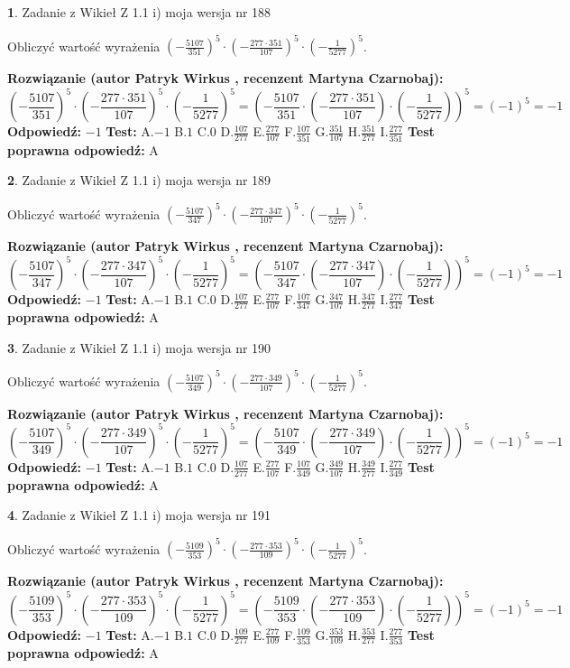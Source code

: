 \documentclass[12pt, a4paper]{article}
\theoremstyle{definition} %
\newtheorem{zad}{}
\newcommand{\zadStart}[1]{\begin{zad}#1\newline}
\newcommand{\zadStop}{\end{zad}}
\newcommand{\rozwStart}[2]{\noindent \textbf{Rozwiązanie (autor #1 , recenzent #2): }\newline}
\newcommand{\rozwStop}{\newline}
\newcommand{\odpStart}{\noindent \textbf{Odpowiedź:}\newline}
\newcommand{\odpStop}{\newline}
\newcommand{\testStart}{\noindent \textbf{Test:}\newline}
\newcommand{\testStop}{\newline}
\newcommand{\kluczStart}{\noindent \textbf{Test poprawna odpowiedź:}\newline}
\newcommand{\kluczStop}{\newline}
\begin{document}
\zadStart{Zadanie z Wikieł Z 1.1 i) moja wersja nr 188}

Obliczyć wartość wyrażenia $(-\frac{5107}{351})^{5} \cdot (-\frac{277 \cdot 351}{107})^{5} \cdot (-\frac{1}{5277})^{5}$.
\zadStop
\rozwStart{Patryk Wirkus}{Martyna Czarnobaj}
$$(-\frac{5107}{351})^{5} \cdot (-\frac{277 \cdot 351}{107})^{5} \cdot (-\frac{1}{5277})^{5} = (-\frac{5107}{351} \cdot (-\frac{277 \cdot 351}{107}) \cdot (-\frac{1}{5277}))^{5} = (-1)^{5} = -1$$
\rozwStop
\odpStart
$-1$
\odpStop
\testStart
A.$-1$ B.$1$ C.$0$ D.$\frac{107}{277}$ E.$\frac{277}{107}$
F.$\frac{107}{351}$ G.$\frac{351}{107}$
H.$\frac{351}{277}$
I.$\frac{277}{351}$
\testStop
\kluczStart
A
\kluczStop



\zadStart{Zadanie z Wikieł Z 1.1 i) moja wersja nr 189}

Obliczyć wartość wyrażenia $(-\frac{5107}{347})^{5} \cdot (-\frac{277 \cdot 347}{107})^{5} \cdot (-\frac{1}{5277})^{5}$.
\zadStop
\rozwStart{Patryk Wirkus}{Martyna Czarnobaj}
$$(-\frac{5107}{347})^{5} \cdot (-\frac{277 \cdot 347}{107})^{5} \cdot (-\frac{1}{5277})^{5} = (-\frac{5107}{347} \cdot (-\frac{277 \cdot 347}{107}) \cdot (-\frac{1}{5277}))^{5} = (-1)^{5} = -1$$
\rozwStop
\odpStart
$-1$
\odpStop
\testStart
A.$-1$ B.$1$ C.$0$ D.$\frac{107}{277}$ E.$\frac{277}{107}$
F.$\frac{107}{347}$ G.$\frac{347}{107}$
H.$\frac{347}{277}$
I.$\frac{277}{347}$
\testStop
\kluczStart
A
\kluczStop



\zadStart{Zadanie z Wikieł Z 1.1 i) moja wersja nr 190}

Obliczyć wartość wyrażenia $(-\frac{5107}{349})^{5} \cdot (-\frac{277 \cdot 349}{107})^{5} \cdot (-\frac{1}{5277})^{5}$.
\zadStop
\rozwStart{Patryk Wirkus}{Martyna Czarnobaj}
$$(-\frac{5107}{349})^{5} \cdot (-\frac{277 \cdot 349}{107})^{5} \cdot (-\frac{1}{5277})^{5} = (-\frac{5107}{349} \cdot (-\frac{277 \cdot 349}{107}) \cdot (-\frac{1}{5277}))^{5} = (-1)^{5} = -1$$
\rozwStop
\odpStart
$-1$
\odpStop
\testStart
A.$-1$ B.$1$ C.$0$ D.$\frac{107}{277}$ E.$\frac{277}{107}$
F.$\frac{107}{349}$ G.$\frac{349}{107}$
H.$\frac{349}{277}$
I.$\frac{277}{349}$
\testStop
\kluczStart
A
\kluczStop



\zadStart{Zadanie z Wikieł Z 1.1 i) moja wersja nr 191}

Obliczyć wartość wyrażenia $(-\frac{5109}{353})^{5} \cdot (-\frac{277 \cdot 353}{109})^{5} \cdot (-\frac{1}{5277})^{5}$.
\zadStop
\rozwStart{Patryk Wirkus}{Martyna Czarnobaj}
$$(-\frac{5109}{353})^{5} \cdot (-\frac{277 \cdot 353}{109})^{5} \cdot (-\frac{1}{5277})^{5} = (-\frac{5109}{353} \cdot (-\frac{277 \cdot 353}{109}) \cdot (-\frac{1}{5277}))^{5} = (-1)^{5} = -1$$
\rozwStop
\odpStart
$-1$
\odpStop
\testStart
A.$-1$ B.$1$ C.$0$ D.$\frac{109}{277}$ E.$\frac{277}{109}$
F.$\frac{109}{353}$ G.$\frac{353}{109}$
H.$\frac{353}{277}$
I.$\frac{277}{353}$
\testStop
\kluczStart
A
\kluczStop
\end{document}
